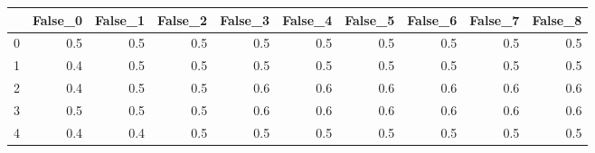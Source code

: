 \begin{tabular}{lrrrrrrrrr}
\toprule
{} &  False\_0 &  False\_1 &  False\_2 &  False\_3 &  False\_4 &  False\_5 &  False\_6 &  False\_7 &  False\_8 \\ \hline
\midrule
0 &      0.5 &      0.5 &      0.5 &      0.5 &      0.5 &      0.5 &      0.5 &      0.5 &      0.5 \\ \hline
1 &      0.4 &      0.5 &      0.5 &      0.5 &      0.5 &      0.5 &      0.5 &      0.5 &      0.5 \\ \hline
2 &      0.4 &      0.5 &      0.5 &      0.6 &      0.6 &      0.6 &      0.6 &      0.6 &      0.6 \\ \hline
3 &      0.5 &      0.5 &      0.5 &      0.6 &      0.6 &      0.6 &      0.6 &      0.6 &      0.6 \\ \hline
4 &      0.4 &      0.4 &      0.5 &      0.5 &      0.5 &      0.5 &      0.5 &      0.5 &      0.5 \\ \hline
\bottomrule
\end{tabular}
